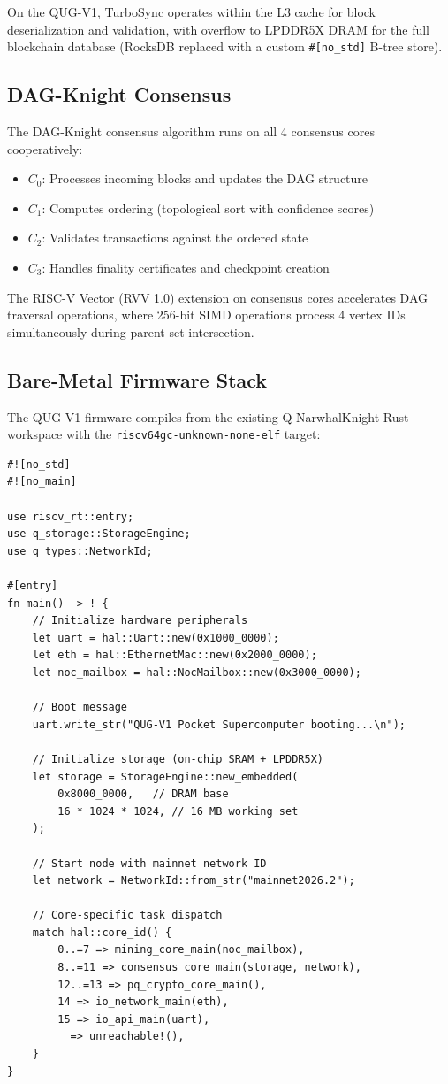 \documentclass[11pt,a4paper]{article}
\begin{document}
On the QUG-V1, TurboSync operates within the L3 cache for block deserialization and validation, with overflow to LPDDR5X DRAM for the full blockchain database (RocksDB replaced with a custom \texttt{\#[no\_std]} B-tree store).

\subsection{DAG-Knight Consensus}

The DAG-Knight consensus algorithm runs on all 4 consensus cores cooperatively:

\begin{itemize}
    \item $C_0$: Processes incoming blocks and updates the DAG structure
    \item $C_1$: Computes ordering (topological sort with confidence scores)
    \item $C_2$: Validates transactions against the ordered state
    \item $C_3$: Handles finality certificates and checkpoint creation
\end{itemize}

The RISC-V Vector (RVV 1.0) extension on consensus cores accelerates DAG traversal operations, where 256-bit SIMD operations process 4 vertex IDs simultaneously during parent set intersection.

\subsection{Bare-Metal Firmware Stack}

The QUG-V1 firmware compiles from the existing Q-NarwhalKnight Rust workspace with the \texttt{riscv64gc-unknown-none-elf} target:

\begin{lstlisting}[style=rust,caption={QUG-V1 Firmware Entry Point}]
#![no_std]
#![no_main]

use riscv_rt::entry;
use q_storage::StorageEngine;
use q_types::NetworkId;

#[entry]
fn main() -> ! {
    // Initialize hardware peripherals
    let uart = hal::Uart::new(0x1000_0000);
    let eth = hal::EthernetMac::new(0x2000_0000);
    let noc_mailbox = hal::NocMailbox::new(0x3000_0000);

    // Boot message
    uart.write_str("QUG-V1 Pocket Supercomputer booting...\n");

    // Initialize storage (on-chip SRAM + LPDDR5X)
    let storage = StorageEngine::new_embedded(
        0x8000_0000,   // DRAM base
        16 * 1024 * 1024, // 16 MB working set
    );

    // Start node with mainnet network ID
    let network = NetworkId::from_str("mainnet2026.2");

    // Core-specific task dispatch
    match hal::core_id() {
        0..=7 => mining_core_main(noc_mailbox),
        8..=11 => consensus_core_main(storage, network),
        12..=13 => pq_crypto_core_main(),
        14 => io_network_main(eth),
        15 => io_api_main(uart),
        _ => unreachable!(),
    }
}
\end{lstlisting}
\end{document}
